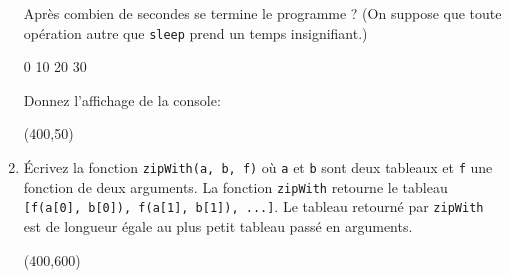 \documentclass[a4paper, 12pt]{article}
\newcommand{\choice}[1]{\Square\hspace{2pt} #1\hspace{5pt}}
\begin{document}
\begin{enumerate}
  Après combien de secondes se termine le programme ?  (On suppose que toute
  opération autre que \lstinline{sleep} prend un temps insignifiant.)

  \choice{0} \choice{10} \choice{20} \choice{30}

  Donnez l'affichage de la console:

  \framebox(400,50){}
\newpage
\item Écrivez la fonction \lstinline{zipWith(a, b, f)} où \lstinline{a} et
  \lstinline{b} sont deux tableaux et \lstinline{f} une fonction de deux
  arguments.  La fonction \lstinline{zipWith} retourne le tableau
  \lstinline{[f(a[0], b[0]), f(a[1], b[1]), ...]}.  Le tableau retourné par
  \lstinline{zipWith} est de longueur égale au plus petit tableau passé en
  arguments.

  \framebox(400,600){}
\end{enumerate}
\end{document}
